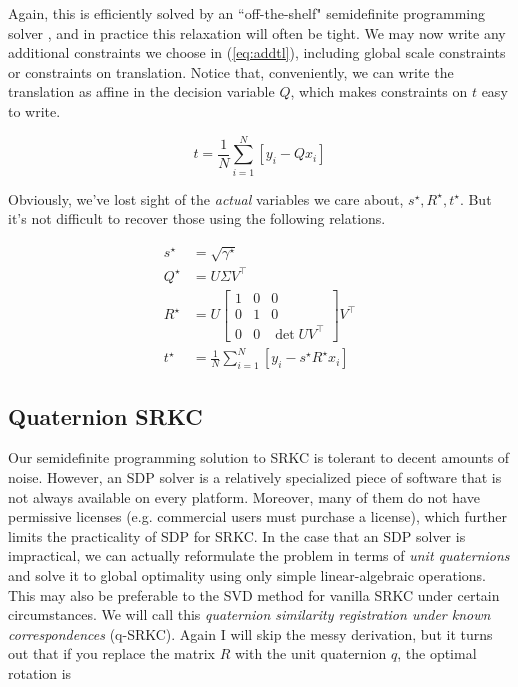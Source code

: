 \documentclass[conference]{IEEEtran}
\begin{document}
Again, this is efficiently solved by an ``off-the-shelf" semidefinite programming solver \cite{cvx}, and in practice this relaxation will often be tight.  We may now write any additional constraints we choose in (\ref{eq:addtl}), including global scale constraints or constraints on translation.  Notice that, conveniently, we can write the translation as affine in the decision variable \( Q \), which makes constraints on \( t \) easy to write.

\begin{equation}
	t = \frac1N \sum_{i=1}^N \left[ y_i - Q x_i \right]
\end{equation}

Obviously, we've lost sight of the \textit{actual} variables we care about, \( s^\star, R^\star, t^\star \).  But it's not difficult to recover those using the following relations.

\begin{align}
	s^\star &= \sqrt{\gamma^\star} \\
	Q^\star &= U \Sigma V^\top \\
	R^\star &= U \begin{bmatrix}
		1 & 0 & 0 \\
		0 & 1 & 0 \\
		0 & 0 & \det U V^\top
	\end{bmatrix} V^\top \\
	t^\star &= \frac1N \sum_{i=1}^N \left[ y_i - s^\star R^\star x_i \right]
\end{align}

\subsection{Quaternion SRKC}

Our semidefinite programming solution to SRKC is tolerant to decent amounts of noise.  However, an SDP solver is a relatively specialized piece of software that is not always available on every platform.  Moreover, many of them do not have permissive licenses (e.g. commercial users must purchase a license), which further limits the practicality of SDP for SRKC.  In the case that an SDP solver is impractical, we can actually reformulate the problem in terms of \textit{unit quaternions} and solve it to global optimality using only simple linear-algebraic operations.  This may also be preferable to the SVD method for vanilla SRKC under certain circumstances.  We will call this \textit{quaternion similarity registration under known correspondences} (q-SRKC).  Again I will skip the messy derivation, but it turns out that if you replace the matrix \( R \) with the unit quaternion \( q \), the optimal rotation is
\end{document}
